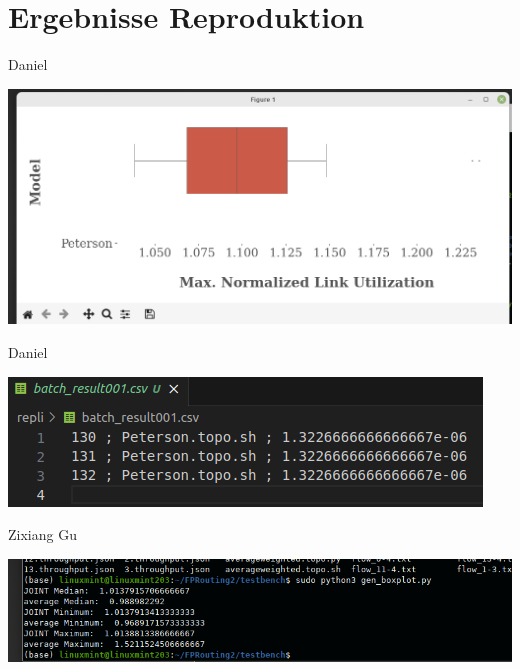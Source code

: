 \documentclass[aspectratio=169,10pt]{beamer}
\begin{document}
\section{Ergebnisse Reproduktion}
\begin{frame}{Daniel}
\begin{center}
\includegraphics[width=\textwidth]{images/repr_daniel_10.png}
\end{center}
\end{frame}
\begin{frame}{Daniel}
\begin{center}
\includegraphics[width=\textwidth]{images/repr_daniel1.png}
\end{center}
\end{frame}
\begin{frame}{Zixiang Gu}
\begin{center}
\includegraphics[width=\textwidth]{images/repr_zixiang1.png}
\end{center}
\end{frame}
\end{document}
